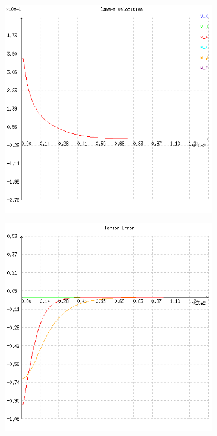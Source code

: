 \begin{figure}[ht!]
\begin{subfigure}{.48\linewidth}
    \caption{}
    \label{fig:ex2cscene}
  \end{subfigure}
  \\
  \begin{subfigure}{.48\linewidth}
    \centering
    \includegraphics[width=\linewidth]{figures/plots/ex2cvelocity.png}
    \caption{}
    \label{fig:ex2cvelocity}
  \end{subfigure}
  \begin{subfigure}{.48\linewidth}
    \centering
    \includegraphics[width=\linewidth]{figures/plots/ex2cerror.png}

\end{subfigure}
\end{figure}
